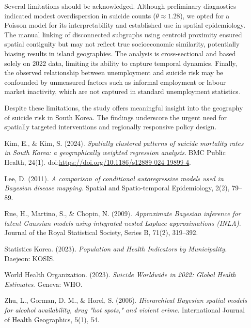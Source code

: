 \documentclass[11pt]{article}
\begin{document}
	Several limitations should be acknowledged. Although preliminary diagnostics indicated modest overdispersion in suicide counts ($\theta \approx 1.28$), we opted for a Poisson model for its interpretability and established use in spatial epidemiology. The manual linking of disconnected subgraphs using centroid proximity ensured spatial contiguity but may not reflect true socioeconomic similarity, potentially biasing results in island geographies. The analysis is cross-sectional and based solely on 2022 data, limiting its ability to capture temporal dynamics. Finally, the observed relationship between unemployment and suicide risk may be confounded by unmeasured factors such as informal employment or labour market inactivity, which are not captured in standard unemployment statistics.
	
	Despite these limitations, the study offers meaningful insight into the geography of suicide risk in South Korea. The findings underscore the urgent need for spatially targeted interventions and regionally responsive policy design.
	
	\newpage
	\begin{flushleft}
		\begin{thebibliography}{9}
			Kim, E., \& Kim, S. (2024). \textit{Spatially clustered patterns of suicide mortality rates in South Korea: a geographically weighted regression analysis}. BMC Public Health, 24(1). doi:\url{https://doi.org/10.1186/s12889-024-19899-4}.
			
			Lee, D. (2011). \textit{A comparison of conditional autoregressive models used in Bayesian disease mapping}. Spatial and Spatio-temporal Epidemiology, 2(2), 79--89.
			
			Rue, H., Martino, S., \& Chopin, N. (2009). \textit{Approximate Bayesian inference for latent Gaussian models using integrated nested Laplace approximations (INLA)}. Journal of the Royal Statistical Society, Series B, 71(2), 319--392.
			
			Statistics Korea. (2023). \textit{Population and Health Indicators by Municipality}. Daejeon: KOSIS.
			
			World Health Organization. (2023). \textit{Suicide Worldwide in 2022: Global Health Estimates}. Geneva: WHO.
			
			Zhu, L., Gorman, D. M., \& Horel, S. (2006). \textit{Hierarchical Bayesian spatial models for alcohol availability, drug "hot spots," and violent crime}. International Journal of Health Geographics, 5(1), 54.
		\end{thebibliography}
	\end{flushleft}
	
\end{document}
